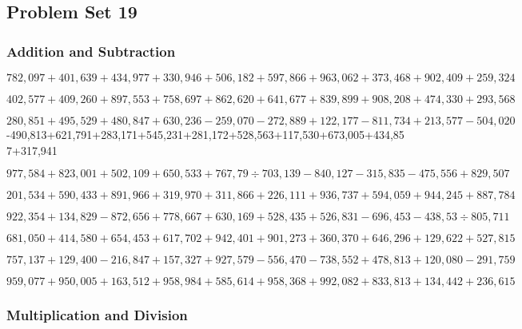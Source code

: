 \hypertarget{problem-set-19-5}{%
\subsection{Problem Set 19}\label{problem-set-19-5}}

\hypertarget{addition-and-subtraction-324}{%
\subsubsection{Addition and
Subtraction}\label{addition-and-subtraction-324}}

\(782,097+401,639+434,977+330,946+506,182+597,866+963,062+373,468+902,409+ 259,324\)

\(402,577+409,260+897,553+758,697+862,620+641,677+839,899+908,208+474,330+293,568\)

\(280,851+495,529+480,847+630,236-259,070-272,889+122,177-811,734+213,577-504,020\)
-490,813+621,791+283,171+545,231+281,172+528,563+117,530+673,005+434,857+317,941

\(977,584+823,001+502,109+650,533+767,79÷703,139-840,127-315,835-475,556+829,507\)

\(201,534+590,433+891,966+319,970+311,866+226,111+936,737+594,059+944,245+887,784\)

\(922,354+134,829-872,656+778,667+630,169+528,435+526,831-696,453-438,53÷805,711\)

\(681,050+414,580+654,453+617,702+942,401+901,273+360,370+646,296+129,622+527,815\)

\(757,137+129,400-216,847+157,327+927,579-556,470-738,552+478,813+120,080-291,759\)

\(959,077+950,005+163,512+958,984+585,614+958,368+992,082+833,813+134,442+236,615\)

\hypertarget{multiplication-and-division-323}{%
\subsubsection{Multiplication and
Division}\label{multiplication-and-division-323}}

